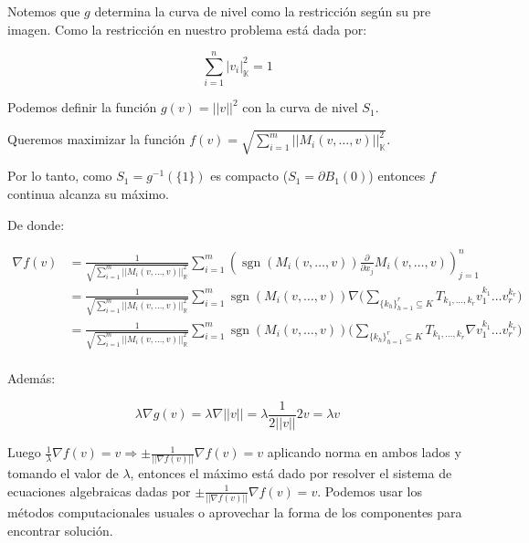 \begin{rmrk}
	Notemos que $g$ determina la curva de nivel como la restricción según su pre imagen. Como la restricción en nuestro problema está dada por:
	
	\begin{equation*}
		\sum_{i = 1}^n |v_i|_{\mathbb{K}}^2 = 1 
	\end{equation*}
	
	Podemos definir la función $g(v) = ||v||^2$ con la curva de nivel $S_1$.
	
	Queremos maximizar la función  $f(v) = \sqrt{\sum_{i =1}^m||M_i(v,\dots,v)||_{\mathbb{K}}^2}$.
	
	Por lo tanto, como $S_1 = g^{-1}(\{1\})$ es compacto  ($S_1 = \partial B_1(0)$) entonces $f$ continua alcanza su máximo.
	
	De donde:
	
	\begin{align*}
		\nabla f(v)
		&= \frac{1}{\sqrt{\sum_{i =1}^m||M_i(v,\dots,v)||_{\mathbb{R}}^2} } \sum_{i =1}^m ( \operatorname{sgn}( M_i(v,\dots,v) ) \frac{\partial}{\partial x_j} M_i(v,\dots,v) )_{ j = 1 }^n\\
		&= \frac{1}{\sqrt{\sum_{i =1}^m||M_i(v,\dots,v)||_{\mathbb{R}}^2} } \sum_{i =1}^m  \operatorname{sgn}( M_i(v,\dots,v) ) \nabla \bigg(\sum_{\{k_h\}_{h = 1}^r \subseteq K} T_{k_1,\dots, k_r}v_1^{k_1} \dots  v_r^{k_r}\bigg) \\
		&= \frac{1}{\sqrt{\sum_{i =1}^m||M_i(v,\dots,v)||_{\mathbb{R}}^2} } \sum_{i =1}^m  \operatorname{sgn}( M_i(v,\dots,v) )  \bigg(\sum_{\{k_h\}_{h = 1}^r \subseteq K} T_{k_1,\dots, k_r}\nabla v_1^{k_1} \dots  v_r^{k_r}\bigg) \\
	\end{align*}
	
	Además: 
	
	\begin{equation*}
		\lambda \nabla g (v) =  \lambda \nabla ||v|| = \lambda \frac{1}{2||v||} 2 v = \lambda v
	\end{equation*}
	
	Luego $\frac{1}{\lambda}\nabla f(v) = v \Rightarrow \pm \frac{1}{||\nabla f(v)||}\nabla f(v) = v $ aplicando norma en ambos lados y tomando el valor de $\lambda$, entonces el máximo está dado por resolver el sistema de ecuaciones algebraicas dadas por $\pm \frac{1}{||\nabla f(v)||}\nabla f(v) = v$. Podemos usar los métodos computacionales usuales o aprovechar la forma de los componentes para encontrar solución.
\end{rmrk}



